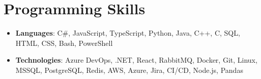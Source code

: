 \documentclass[letterpaper,11pt]{article}
\newcommand{\resumeItem}[1]{
  \item\small{
    \textbf{#1 \vspace{-2pt}}
  }
}
\newcommand{\resumeSubItem}[2]{\resumeItem{#1}{#2}\vspace{-4pt}}
\newcommand{\resumeSubHeadingListStart}{\begin{itemize}[leftmargin=*]}
\newcommand{\resumeSubHeadingListEnd}{\end{itemize}}
\begin{document}
\begin{comment}
\section{Projects}
\resumeSubHeadingListStart
\resumeSubItem{QuantSoftware Toolkit}
{Open source python library for financial data analysis and machine learning for finance.}
\resumeSubItem{Github Visualization}
{Data Visualization of Git Log data using D3 to analyze project trends over time.}
\resumeSubItem{Recommendation System}
{Music and Movie recommender systems using collaborative filtering on public datasets.}
\resumeSubItem{Mac Setup}
{Book that gives step by step instructions on setting up developer environment on Mac OS.}
\resumeSubHeadingListEnd
\end{comment}

%
\section{Programming Skills}
\resumeSubHeadingListStart
\item{
            \textbf{Languages}{: C\#, JavaScript, TypeScript, Python, Java, C++, C, SQL, HTML, CSS, Bash, PowerShell}
      }
\item{
            \textbf{Technologies}{: Azure DevOps, .NET, React, RabbitMQ, Docker, Git, Linux, MSSQL, PostgreSQL, Redis, AWS, Azure, Jira, CI/CD, Node.js, Pandas}
      }
\resumeSubHeadingListEnd


\end{document}

